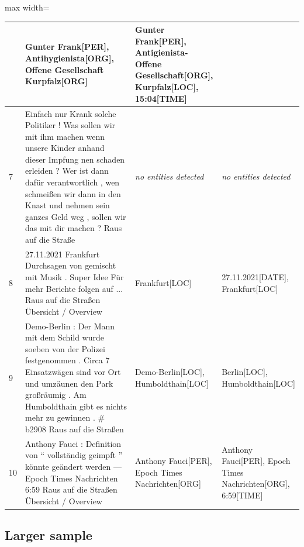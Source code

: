 \begin{table}[htp]
\begin{adjustbox}{max width=\textwidth}
\begin{tabular}{|p{0.04\linewidth}|p{0.6\linewidth}|p{0.3\linewidth}|p{0.35\linewidth}|}
& Gunter Frank[PER], Antihygienista[ORG], Offene Gesellschaft Kurpfalz[ORG]
& Gunter Frank[PER], Antigienista- Offene Gesellschaft[ORG], Kurpfalz[LOC], 15:04[TIME]\\ 
\hline
7 
& Einfach nur Krank solche Politiker ! Was sollen wir mit ihm machen wenn unsere Kinder anhand dieser Impfung nen schaden erleiden ? Wer ist dann dafür verantwortlich , wen schmeißen wir dann in den Knast und nehmen sein ganzes Geld weg , sollen wir das mit dir machen ? Raus auf die Straße 
& \textit{no entities detected}
& \textit{no entities detected}\\ 
\hline
8 
& 27.11.2021 Frankfurt Durchsagen von gemischt mit Musik . Super Idee   Für mehr Berichte folgen auf ... Raus auf die Straßen   \"Ubersicht / Overview 
& Frankfurt[LOC]
& 27.11.2021[DATE], Frankfurt[LOC]\\ 
\hline
9 
& Demo-Berlin : Der Mann mit dem Schild wurde soeben von der Polizei festgenommen . Circa 7 Einsatzwägen sind vor Ort und umzäunen den Park großräumig . Am Humboldthain gibt es nichts mehr zu gewinnen . \# b2908 Raus auf die Straßen 
& Demo-Berlin[LOC], Humboldthain[LOC]
& Berlin[LOC], Humboldthain[LOC]\\ 
\hline
10 
& Anthony Fauci : Definition von `` vollständig geimpft '' könnte geändert werden — Epoch Times Nachrichten 6:59 Raus auf die Straßen   \"Ubersicht / Overview 
& Anthony Fauci[PER], Epoch Times Nachrichten[ORG]
& Anthony Fauci[PER], Epoch Times Nachrichten[ORG], 6:59[TIME]
\end{tabular}
\end{adjustbox}
\end{table}

\subsection{Larger sample}



